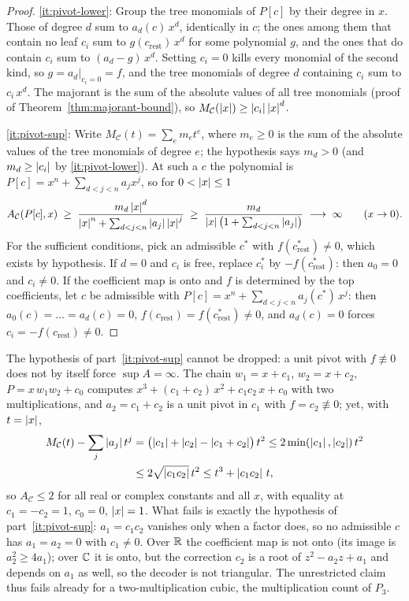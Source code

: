 \begin{proof}
\ref{it:pivot-lower}: Group the tree monomials of $P[c]$ by their degree in
$x$.  Those of degree $d$ sum to $a_d(c)\,x^d$, identically in $c$; the ones
among them that contain no leaf $c_i$ sum to $g(c_{\mathrm{rest}})\,x^d$ for
some polynomial $g$, and the ones that do contain $c_i$ sum to
$(a_d-g)\,x^d$.  Setting $c_i=0$ kills every monomial of the second kind, so
$g=a_d|_{c_i=0}=f$, and the tree monomials of degree $d$ containing $c_i$
sum to $c_i\,x^d$.  The majorant is the sum of the absolute values of all
tree monomials (proof of Theorem~\ref{thm:majorant-bound}), so
$M_{\mathcal C}(\left\lvert x\right\rvert)\ge\left\lvert c_i\right\rvert\left\lvert x\right\rvert^d$.

\ref{it:pivot-sup}: Write $M_{\mathcal C}(t)=\sum_e m_e t^e$, where
$m_e\ge0$ is the sum of the absolute values of the tree monomials of degree
$e$; the hypothesis says $m_d>0$ (and $m_d\ge\left\lvert c_i\right\rvert$ by
\ref{it:pivot-lower}).  At such a $c$ the polynomial is
$P[c]=x^n+\sum_{d<j<n}a_jx^j$, so for $0<\left\lvert x\right\rvert\le1$
\[
  A_{\mathcal C}(P[c],x)\;\ge\;
  \frac{m_d\left\lvert x\right\rvert^d}{\left\lvert x\right\rvert^n+\sum_{d<j<n}\left\lvert a_j\right\rvert\left\lvert x\right\rvert^j}
  \;\ge\;\frac{m_d}{\left\lvert x\right\rvert\bigl(1+\sum_{d<j<n}\left\lvert a_j\right\rvert\bigr)}
  \;\longrightarrow\;\infty\qquad(x\to0).
\]
For the sufficient conditions, pick an admissible $c^*$ with
$f(c^*_{\mathrm{rest}})\ne0$, which exists by hypothesis.  If $d=0$
and $c_i$ is free, replace $c^*_i$ by $-f(c^*_{\mathrm{rest}})$: then
$a_0=0$ and $c_i\ne0$.  If the coefficient map is onto and $f$ is
determined by the top coefficients, let $c$ be admissible with
$P[c]=x^n+\sum_{d<j<n}a_j(c^*)\,x^j$: then $a_0(c)=\dots=a_d(c)=0$,
$f(c_{\mathrm{rest}})=f(c^*_{\mathrm{rest}})\ne0$, and $a_d(c)=0$ forces
$c_i=-f(c_{\mathrm{rest}})\ne0$.
\end{proof}

\begin{remark}
\label{rem:unit-pivot-counterexample}
The hypothesis of part~\ref{it:pivot-sup} cannot be dropped: a unit pivot
with $f\not\equiv0$ does not by itself force $\sup A=\infty$.  The chain
$w_1=x+c_1$, $w_2=x+c_2$, $P=x\,w_1w_2+c_0$ computes
$x^3+(c_1+c_2)\,x^2+c_1c_2\,x+c_0$ with two multiplications, and
$a_2=c_1+c_2$ is a unit pivot in $c_1$ with $f=c_2\not\equiv0$; yet, with
$t=\left\lvert x\right\rvert$,
\[
\begin{aligned}
  M_{\mathcal C}(t)-\sum_j\left\lvert a_j\right\rvert t^j
  &=\bigl(\left\lvert c_1\right\rvert+\left\lvert c_2\right\rvert-\left\lvert c_1+c_2\right\rvert\bigr)\,t^2
  \le2\min(\left\lvert c_1\right\rvert,\left\lvert c_2\right\rvert)\,t^2\\
  &\le2\sqrt{\left\lvert c_1c_2\right\rvert}\,t^2
  \le t^3+\left\lvert c_1c_2\right\rvert\,t ,
\end{aligned}
\]
so $A_{\mathcal C}\le2$ for all real or complex constants and all $x$, with
equality at $c_1=-c_2=1$, $c_0=0$, $\left\lvert x\right\rvert=1$.  What fails is exactly the
hypothesis of part~\ref{it:pivot-sup}: $a_1=c_1c_2$ vanishes only when a
factor does, so no admissible $c$ has $a_1=a_2=0$ with $c_1\ne0$.  Over
$\mathbb{R}$ the coefficient map is not onto (its image is $a_2^2\ge4a_1$); over
$\mathbb{C}$ it is onto, but the correction $c_2$ is a root of $z^2-a_2z+a_1$ and
depends on $a_1$ as well, so the decoder is not triangular.  The
unrestricted claim thus fails already for a two-multiplication cubic, the
multiplication count of $P_3$.
\end{remark}

